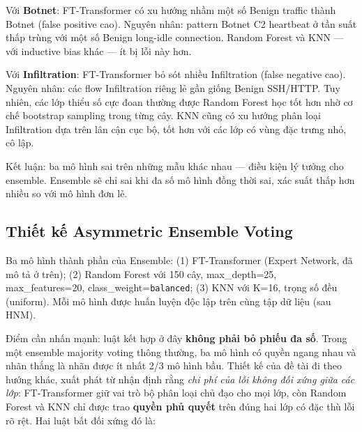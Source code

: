 \documentclass[../DoAn.tex]{subfiles}
\begin{document}
Với \textbf{Botnet}: FT-Transformer có xu hướng nhầm một số Benign traffic thành Botnet (false positive cao). Nguyên nhân: pattern Botnet C2 heartbeat ở tần suất thấp trùng với một số Benign long-idle connection. Random Forest và KNN --- với inductive bias khác --- ít bị lỗi này hơn.

Với \textbf{Infiltration}: FT-Transformer bỏ sót nhiều Infiltration (false negative cao). Nguyên nhân: các flow Infiltration riêng lẻ gần giống Benign SSH/HTTP. Tuy nhiên, các lớp thiểu số cực đoan thường được Random Forest học tốt hơn nhờ cơ chế bootstrap sampling trong từng cây. KNN cũng có xu hướng phân loại Infiltration dựa trên lân cận cục bộ, tốt hơn với các lớp có vùng đặc trưng nhỏ, cô lập.

Kết luận: ba mô hình sai trên những mẫu khác nhau --- điều kiện lý tưởng cho ensemble. Ensemble sẽ chỉ sai khi đa số mô hình đồng thời sai, xác suất thấp hơn nhiều so với mô hình đơn lẻ.

\subsection{Thiết kế Asymmetric Ensemble Voting}
\label{subsec:gd2-ensemble}

Ba mô hình thành phần của Ensemble: (1) FT-Transformer (Expert Network, đã mô tả ở trên); (2) Random Forest với 150 cây, max\_depth=25, max\_features=20, class\_weight=\texttt{balanced}; (3) KNN với K=16, trọng số đều (uniform). Mỗi mô hình được huấn luyện độc lập trên cùng tập dữ liệu (sau HNM).

Điểm cần nhấn mạnh: luật kết hợp ở đây \textbf{không phải bỏ phiếu đa số}. Trong một ensemble majority voting thông thường, ba mô hình có quyền ngang nhau và nhãn thắng là nhãn được ít nhất 2/3 mô hình bầu. Thiết kế của đề tài đi theo hướng khác, xuất phát từ nhận định rằng \textit{chi phí của lỗi không đối xứng giữa các lớp}: FT-Transformer giữ vai trò bộ phân loại chủ đạo cho mọi lớp, còn Random Forest và KNN chỉ được trao \textbf{quyền phủ quyết} trên đúng hai lớp có đặc thù lỗi rõ rệt. Hai luật bất đối xứng đó là:
\end{document}
